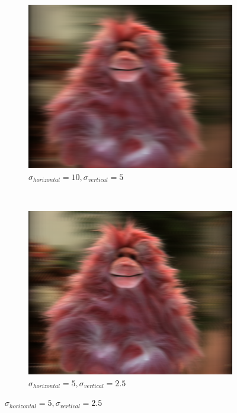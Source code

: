 \documentclass[a4paper]{article}
\begin{document}
\begin{figure}[ht]
	\begin{subfigure}[h]{0.48\textwidth}
	  \includegraphics[width=\textwidth]{shearedGauss_k1_shear16_sighor10_sigvert5}
	  \caption*{$\sigma_{horizontal} = 10, \sigma_{vertical} = 5$}
	\end{subfigure}
    	~
	\begin{subfigure}[h]{0.48\textwidth}
	  \includegraphics[width=\textwidth]{shearedGauss_k1_shear16_sighor5_sigvert2-5}
	  \caption*{$\sigma_{horizontal} = 5, \sigma_{vertical} = 2.5$}
	\end{subfigure}
	

\end{figure}
\end{document}
